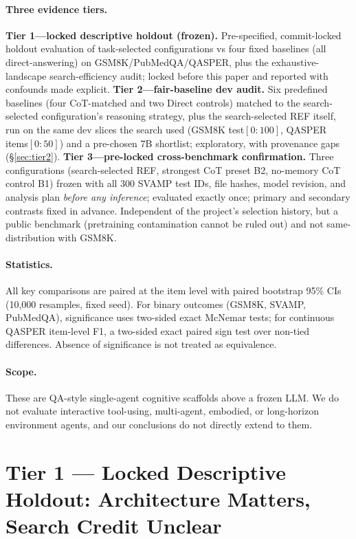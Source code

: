 \documentclass[11pt]{article}
\begin{document}
\paragraph{Three evidence tiers.}
\textbf{Tier 1---locked descriptive holdout (frozen).} Pre-specified,
commit-locked holdout evaluation of task-selected configurations vs four
fixed baselines (all direct-answering) on GSM8K/PubMedQA/QASPER, plus the
exhaustive-landscape search-efficiency audit; locked before this paper and
reported with confounds made explicit.
\textbf{Tier 2---fair-baseline dev audit.} Six predefined baselines (four
CoT-matched and two Direct controls) matched to the search-selected
configuration's reasoning strategy, plus the search-selected REF itself,
run on the same dev slices the search used (GSM8K test$[0{:}100]$, QASPER items$[0{:}50]$) and
a pre-chosen 7B shortlist; exploratory, with provenance gaps (\S\ref{sec:tier2}).
\textbf{Tier 3---pre-locked cross-benchmark confirmation.} Three
configurations (search-selected REF, strongest CoT preset B2, no-memory CoT
control B1) frozen with all 300 SVAMP test IDs, file hashes, model
revision, and analysis plan \emph{before any inference}; evaluated exactly
once; primary and secondary contrasts fixed in advance. Independent of the
project's selection history, but a public benchmark (pretraining
contamination cannot be ruled out) and not same-distribution with GSM8K.

\paragraph{Statistics.} All key comparisons are paired at the item level
with paired bootstrap 95\% CIs (10{,}000 resamples, fixed seed). For binary
outcomes (GSM8K, SVAMP, PubMedQA), significance uses two-sided exact
McNemar tests; for continuous QASPER item-level F1, a two-sided exact
paired sign test over non-tied differences. Absence of significance is not
treated as equivalence.

\paragraph{Scope.} These are QA-style single-agent cognitive scaffolds
above a frozen LLM. We do not evaluate interactive tool-using, multi-agent,
embodied, or long-horizon environment agents, and our conclusions do not
directly extend to them.

\section{Tier 1 --- Locked Descriptive Holdout: Architecture Matters, Search Credit Unclear}
\label{sec:tier1}
\end{document}
